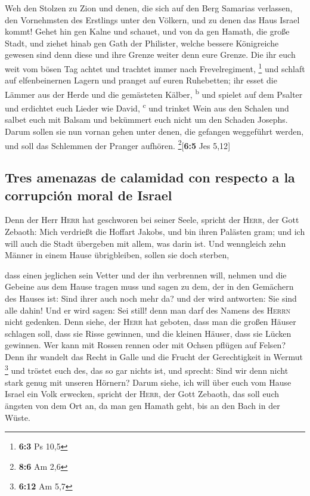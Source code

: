  Weh den Stolzen zu Zion und denen, die sich auf den Berg
Samarias verlassen, den Vornehmsten des Erstlings unter den Völkern, und
zu denen das Haus Israel kommt!  Gehet hin gen Kalne und
schauet, und von da gen Hamath, die große Stadt, und ziehet hinab gen
Gath der Philister, welche bessere Königreiche gewesen sind denn diese
und ihre Grenze weiter denn eure Grenze.  Die ihr euch
weit vom bösen Tag achtet und trachtet immer nach Frevelregiment,
\footnote{\textbf{6:3} Ps 10,5}  und schlaft auf
elfenbeinernen Lagern und pranget auf euren Ruhebetten; ihr esset die
Lämmer aus der Herde und die gemästeten Kälber, \textsuperscript{b}
 und spielet auf dem Psalter und erdichtet euch Lieder wie
David, \textsuperscript{c}  und trinket Wein aus den
Schalen und salbet euch mit Balsam und bekümmert euch nicht um den
Schaden Josephs.  Darum sollen sie nun vornan gehen unter
denen, die gefangen weggeführt werden, und soll das Schlemmen der
Pranger aufhören. \footnote{\textbf{8:6} Am 2,6}{[}\textbf{6:5} Jes
5,12{]}

\hypertarget{tres-amenazas-de-calamidad-con-respecto-a-la-corrupciuxf3n-moral-de-israel}{%
\subsection{Tres amenazas de calamidad con respecto a la corrupción
moral de
Israel}\label{tres-amenazas-de-calamidad-con-respecto-a-la-corrupciuxf3n-moral-de-israel}}

 Denn der Herr \textsc{Herr} hat geschworen bei seiner
Seele, spricht der \textsc{Herr}, der Gott Zebaoth: Mich verdrießt die
Hoffart Jakobs, und bin ihren Palästen gram; und ich will auch die Stadt
übergeben mit allem, was darin ist.  Und wenngleich zehn
Männer in einem Hause übrigbleiben, sollen sie doch sterben,

 dass einen jeglichen sein Vetter und der ihn verbrennen
will, nehmen und die Gebeine aus dem Hause tragen muss und sagen zu dem,
der in den Gemächern des Hauses ist: Sind ihrer auch noch mehr da? und
der wird antworten: Sie sind alle dahin! Und er wird sagen: Sei still!
denn man darf des Namens des \textsc{Herrn} nicht gedenken.
 Denn siehe, der \textsc{Herr} hat geboten, dass man die
großen Häuser schlagen soll, dass sie Risse gewinnen, und die kleinen
Häuser, dass sie Lücken gewinnen.  Wer kann mit Rossen
rennen oder mit Ochsen pflügen auf Felsen? Denn ihr wandelt das Recht in
Galle und die Frucht der Gerechtigkeit in Wermut \footnote{\textbf{6:12}
  Am 5,7}  und tröstet euch des, das so gar nichts ist,
und sprecht: Sind wir denn nicht stark genug mit unseren Hörnern?
 Darum siehe, ich will über euch vom Hause Israel ein
Volk erwecken, spricht der \textsc{Herr}, der Gott Zebaoth, das soll
euch ängsten von dem Ort an, da man gen Hamath geht, bis an den Bach in
der Wüste.

